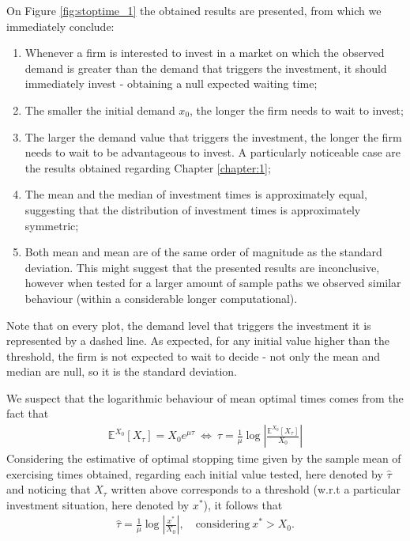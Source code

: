 On Figure \eqref{fig:stoptime_1} the obtained results are presented, from which we immediately conclude:
\begin{enumerate}
	\item %
	Whenever a firm is interested to invest in a market on which the observed demand is greater than the demand that triggers the investment, it should immediately invest - obtaining a null expected waiting time;
	\item The smaller the initial demand $x_0$, the longer the firm needs to wait to invest;
	\item The larger the demand value that triggers the investment, the longer the firm needs to wait to be advantageous to invest. A particularly noticeable case are the results obtained regarding Chapter \ref{chapter:1};
	\item The mean and the median of investment times is approximately equal, suggesting that the distribution of investment times is approximately symmetric;
	\item Both mean and mean are of the same order of magnitude as the standard deviation. This might suggest that the presented results are inconclusive, however when tested for a larger amount of sample paths we observed similar behaviour (within a considerable longer computational).
\end{enumerate}
Note that on every plot, the demand level that triggers the investment it is represented by a dashed line. As expected, for any initial value higher than the threshold,
the firm is not expected to wait to decide
- not only the mean and median are null, so it is the standard deviation.





We suspect that the logarithmic behaviour of mean optimal times comes from the fact that
\begin{align*}
\mathds{E}^{X_0}[X_\tau]=X_0 e^{\mu \tau} \ \Leftrightarrow \ \tau= \frac{1}{\mu} \log \left|  \frac{\mathds{E}^{X_0}[X_\tau]}{X_0} \right|
\end{align*}
Considering the estimative of optimal stopping time given by the sample mean of exercising times obtained, regarding each initial value tested, here denoted by $\hat{\tau}$ and noticing that $X_\tau$ written above corresponds to a threshold (w.r.t a particular investment situation, here denoted by $x^*$), it follows that
\begin{align}
 \hat{\tau}=\frac{1}{\mu} \log \left|  \frac{x^*}{X_0} \right|, \quad \text{considering} \ x^*> X_0.
\end{align}


